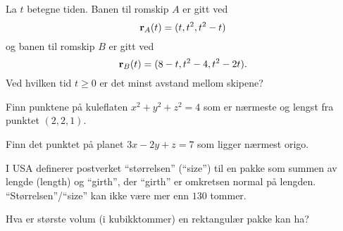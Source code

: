 
\oppgave[V2017, Oppgave 2] La $t$ betegne tiden. Banen til romskip $A$ er gitt ved
%
\begin{equation*}
  \mathbf{r}_A(t) = (t, t^2, t^2 - t)
\end{equation*}
%
og banen til romskip $B$ er gitt ved
%
\begin{equation*}
  \mathbf{r}_B(t) = (8 - t, t^2 - 4, t^2 - 2t).
\end{equation*}
%
Ved hvilken tid $t \geq 0$ er det minst avstand mellom skipene?

\oppgave[K2014, Oppgave 7] Finn punktene på kuleflaten $x^2 + y^2 + z^2 = 4$ som
er nærmeste og lengst fra punktet $(2,2,1)$.

\oppgave[K2013, Oppgave 5] Finn det punktet på planet $3x - 2y + z = 7$ som
ligger nærmest origo.

\oppgave[V2013, Oppgave 2] I USA definerer postverket ``størrelsen'' (``size'')
til en pakke som summen av lengde (length) og ``girth'', der ``girth'' er
omkretsen normal på lengden. ``Størrelsen''/``size'' kan ikke være mer enn $130$
tommer. \medskip

Hva er største volum (i kubikktommer) en rektangulær pakke kan ha?


